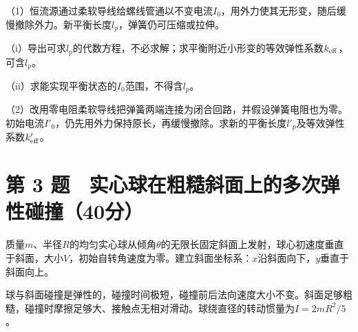 \documentclass[12pt,a4paper,fontset=fandol]{ctexart}
\begin{document}
（1）恒流源通过柔软导线给螺线管通以不变电流\(I_0\)，用外力使其无形变，随后缓慢撤除外力。新平衡长度\(l_p\)，弹簧仍可压缩或拉伸。

（i）导出可求\(l_p\)的代数方程，不必求解；求平衡附近小形变的等效弹性系数\(k_{\rm eff}\)，可含\(l_p\)。

（ii）求能实现平衡状态的\(I_0\)范围，不得含\(l_p\)。

（2）改用零电阻柔软导线把弹簧两端连接为闭合回路，并假设弹簧电阻也为零。初始电流\(I'_0\)，仍先用外力保持原长，再缓慢撤除。求新的平衡长度\(l'_p\)及等效弹性系数\(k'_{\rm eff}\)。

\begin{center}
\begin{minipage}{\linewidth}
\centering\begingroup{}
\ifdim\wd\diagrambox>.88\linewidth
\sbox{\diagrambox}{\resizebox{.88\linewidth}{!}{\usebox{\diagrambox}}}\fi
\ifdim\ht\diagrambox>.20\textheight
\resizebox{!}{.20\textheight}{\usebox{\diagrambox}}
\else\usebox{\diagrambox}\fi
\par{}\endgroup\end{minipage}\end{center}

\clearpage

\section{第 3
题　实心球在粗糙斜面上的多次弹性碰撞（40分）}\label{ux7b2c-3-ux9898-ux5b9eux5fc3ux7403ux5728ux7c97ux7cd9ux659cux9762ux4e0aux7684ux591aux6b21ux5f39ux6027ux78b0ux649e40ux5206}

质量\(m\)、半径\(R\)的均匀实心球从倾角\(\theta\)的无限长固定斜面上发射，球心初速度垂直于斜面，大小\(V\)，初始自转角速度为零。建立斜面坐标系：\(x\)沿斜面向下，\(y\)垂直于斜面向上。

球与斜面碰撞是弹性的，碰撞时间极短，碰撞前后法向速度大小不变。斜面足够粗糙，碰撞时摩擦足够大、接触点无相对滑动。球绕直径的转动惯量为\(I=2mR^2/5\)。
\end{document}
